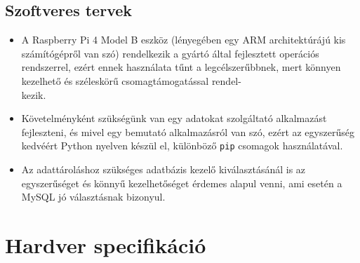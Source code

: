 \documentclass[11pt, a4paper]{article}
\begin{document}
		\subsection{Szoftveres tervek}
			\begin{itemize}
				\justifying
				\item A Raspberry Pi 4 Model B eszköz (lényegében egy ARM architektúrájú kis számítógépről van szó) rendelkezik a gyártó által fejlesztett operációs rendszerrel, ezért ennek használata tűnt a legcélszerűbbnek, mert könnyen kezelhető és széleskörű csomagtámogatással rendel-\\kezik.
				
				\item Követelményként szükségünk van egy adatokat szolgáltató alkalmazást fejleszteni, és mivel egy bemutató alkalmazásról van szó, ezért az egyszerűség kedvéért Python nyelven készül el, különböző \texttt{pip} csomagok használatával.
				
				\item Az adattároláshoz szükséges adatbázis kezelő kiválasztásánál is az egyszerűséget és könnyű kezelhetőséget érdemes alapul venni, ami esetén a MySQL jó választásnak bizonyul.
			\end{itemize}
	
	\section{Hardver specifikáció}			
\end{document}
